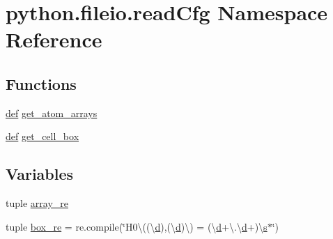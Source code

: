 \hypertarget{namespacepython_1_1fileio_1_1read_cfg}{\section{python.\-fileio.\-read\-Cfg Namespace Reference}
\label{namespacepython_1_1fileio_1_1read_cfg}
}
\subsection*{Functions}
\begin{DoxyCompactItemize}
\item 
\hyperlink{sim_image_from_wave_8m_a72b6b8e83430abf007f20aeae4dc2f74}{def} \hyperlink{namespacepython_1_1fileio_1_1read_cfg_aae086b7fa3ade4aaf4c7aec598e23344}{get\-\_\-atom\-\_\-arrays}
\item 
\hyperlink{sim_image_from_wave_8m_a72b6b8e83430abf007f20aeae4dc2f74}{def} \hyperlink{namespacepython_1_1fileio_1_1read_cfg_a1769a0316d318139caae32b4d48e3056}{get\-\_\-cell\-\_\-box}
\end{DoxyCompactItemize}
\subsection*{Variables}
\begin{DoxyCompactItemize}
\item 
tuple \hyperlink{namespacepython_1_1fileio_1_1read_cfg_a5604f72b29109b23876023593a3eefd3}{array\-\_\-re}
\item 
tuple \hyperlink{namespacepython_1_1fileio_1_1read_cfg_ab37ee94881162c11a48d464d4ac60ade}{box\-\_\-re} = re.\-compile(\char`\"{}H0\textbackslash{}((\textbackslash{}\hyperlink{_read_d_m3___matlab_8m_a1aabac6d068eef6a7bad3fdf50a05cc8}{d}),(\textbackslash{}\hyperlink{_read_d_m3___matlab_8m_a1aabac6d068eef6a7bad3fdf50a05cc8}{d})\textbackslash{}) = (\textbackslash{}\hyperlink{_read_d_m3___matlab_8m_a1aabac6d068eef6a7bad3fdf50a05cc8}{d}+\textbackslash{}.\textbackslash{}\hyperlink{_read_d_m3___matlab_8m_a1aabac6d068eef6a7bad3fdf50a05cc8}{d}+)\textbackslash{}\hyperlink{aberrations___t_e_m_8m_aef29541a06b7f933d32a804307db13af}{s}$\ast$\char`\"{})
\end{DoxyCompactItemize}


